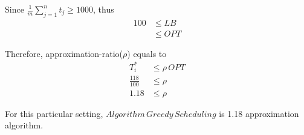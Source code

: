 Since $\frac{1}{m}\sum\limits_{j=1}^n t_j \ge 1000$, thus
\begin{align*}
100 &\le LB \\
&\le OPT
\end{align*}

Therefore, approximation-ratio($\rho$) equals to
\begin{align*}
T_i^* &\le \rho \, OPT \\
\frac{118}{100} &\le \rho \\
1.18 &\le \rho 
\end{align*}

For this particular setting, $Algorithm \,Greedy \,Scheduling$ is 1.18 approximation algorithm.

